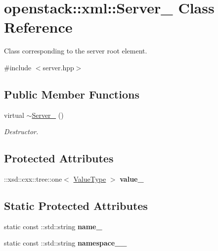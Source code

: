 \hypertarget{classopenstack_1_1xml_1_1Server__}{
\section{openstack::xml::Server\_\- Class Reference}
\label{classopenstack_1_1xml_1_1Server__}
}


Class corresponding to the server root element.  




{\ttfamily \#include $<$server.hpp$>$}

\subsection*{Public Member Functions}
\begin{DoxyCompactItemize}
\item 
\hypertarget{classopenstack_1_1xml_1_1Server___a871dba5106f9465710d71eec00a83806}{
virtual \hyperlink{classopenstack_1_1xml_1_1Server___a871dba5106f9465710d71eec00a83806}{$\sim$Server\_\-} ()}
\label{classopenstack_1_1xml_1_1Server___a871dba5106f9465710d71eec00a83806}

\begin{DoxyCompactList}\small\item\em Destructor. \item\end{DoxyCompactList}\end{DoxyCompactItemize}
\subsection*{Protected Attributes}
\begin{DoxyCompactItemize}
\item 
\hypertarget{classopenstack_1_1xml_1_1Server___a7b113fed408fea3d2ef81bbfa96e96d9}{
::xsd::cxx::tree::one$<$ \hyperlink{classopenstack_1_1xml_1_1Server}{ValueType} $>$ {\bfseries value\_\-}}
\label{classopenstack_1_1xml_1_1Server___a7b113fed408fea3d2ef81bbfa96e96d9}

\end{DoxyCompactItemize}
\subsection*{Static Protected Attributes}
\begin{DoxyCompactItemize}
\item 
\hypertarget{classopenstack_1_1xml_1_1Server___a18cb7fe26141450c133bb16f7f08f2c1}{
static const ::std::string {\bfseries name\_\-}}
\label{classopenstack_1_1xml_1_1Server___a18cb7fe26141450c133bb16f7f08f2c1}

\item 
\hypertarget{classopenstack_1_1xml_1_1Server___ad8153a14ee4908c84fc50d90e8986110}{
static const ::std::string {\bfseries namespace\_\-\_\-}}
\label{classopenstack_1_1xml_1_1Server___ad8153a14ee4908c84fc50d90e8986110}

\end{DoxyCompactItemize}
